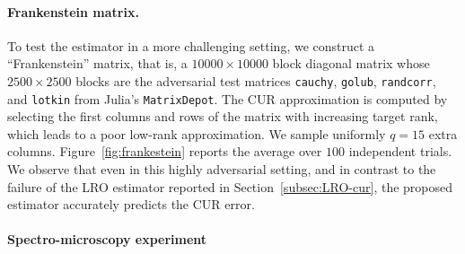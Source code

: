 \documentclass[11pt]{article}
\begin{document}
\paragraph{Frankenstein matrix.}
To test the estimator in a more challenging setting, we construct a ``Frankenstein'' matrix,
that is, a $10000 \times 10000$ block diagonal matrix whose $2500 \times 2500$ blocks are
the adversarial test matrices \texttt{cauchy}, \texttt{golub}, \texttt{randcorr}, and \texttt{lotkin}
from Julia's \texttt{MatrixDepot}.
The CUR approximation is computed by selecting the first columns and rows of the matrix with increasing target rank,
which leads to a poor low-rank approximation.
We sample uniformly $q = 15$ extra columns.
Figure~\ref{fig:frankestein} reports the average over $100$ independent trials.
We observe that even in this highly adversarial setting,
and in contrast to the failure of the LRO estimator reported in Section~\ref{subsec:LRO-cur},
the proposed estimator accurately predicts the CUR error.
\paragraph{Spectro-microscopy experiment}
\end{document}
